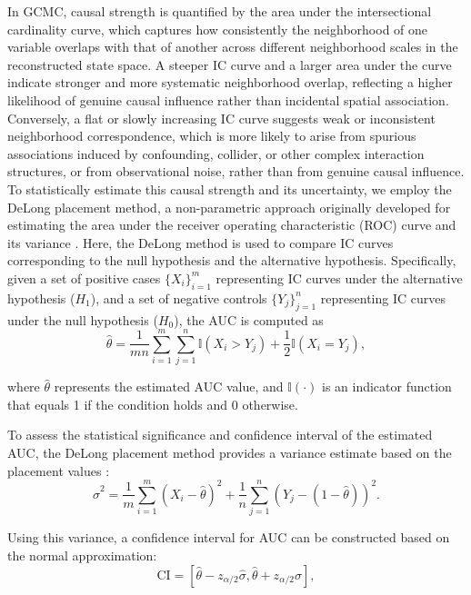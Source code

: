 \documentclass[authoryear,preprint,review,12pt]{elsarticle}
\begin{document}
In GCMC, causal strength is quantified by the area under the intersectional cardinality curve, which captures how consistently the neighborhood of one variable overlaps with that of another across different neighborhood scales in the reconstructed state space. A steeper IC curve and a larger area under the curve indicate stronger and more systematic neighborhood overlap, reflecting a higher likelihood of genuine causal influence rather than incidental spatial association. Conversely, a flat or slowly increasing IC curve suggests weak or inconsistent neighborhood correspondence, which is more likely to arise from spurious associations induced by confounding, collider, or other complex interaction structures, or from observational noise, rather than from genuine causal influence. To statistically estimate this causal strength and its uncertainty, we employ the DeLong placement method, a non-parametric approach originally developed for estimating the area under the receiver operating characteristic (ROC) curve and its variance \citep{delong1988,sun2014delongfi}. Here, the DeLong method is used to compare IC curves corresponding to the null hypothesis and the alternative hypothesis. Specifically, given a set of positive cases $\{X_i\}_{i=1}^{m}$ representing IC curves under the alternative hypothesis ($H_1$), and a set of negative controls $\{Y_j\}_{j=1}^{n}$ representing IC curves under the null hypothesis ($H_0$), the AUC is computed as
\begin{equation}
\hat{\theta} = \frac{1}{mn} \sum_{i=1}^{m} \sum_{j=1}^{n} \mathbb{I}(X_i > Y_j) + \frac{1}{2} \mathbb{I}(X_i = Y_j),
\end{equation}

\noindent where \(\hat{\theta}\) represents the estimated AUC value, and \(\mathbb{I}(\cdot)\) is an indicator function that equals 1 if the condition holds and 0 otherwise.  

To assess the statistical significance and confidence interval of the estimated AUC, the DeLong placement method provides a variance estimate based on the placement values \citep{delong1988,sun2014delongfi}:
\begin{equation}
\hat{\sigma}^2 = \frac{1}{m} \sum_{i=1}^{m} \left( X_i - \hat{\theta} \right)^2 + \frac{1}{n} \sum_{j=1}^{n} \left( Y_j - (1 - \hat{\theta}) \right)^2.
\end{equation}

Using this variance, a confidence interval for AUC can be constructed based on the normal approximation:
\begin{equation}
\text{CI} = \left[ \hat{\theta} - z_{\alpha/2} \hat{\sigma}, \hat{\theta} + z_{\alpha/2} \hat{\sigma} \right],
\end{equation}
\end{document}
